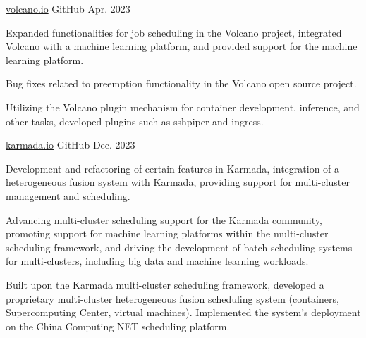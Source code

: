

\begin{cventries}

    \cventry
    {} %
    {\href{https://github.com/volcano-sh/volcano}{volcano.io}} %
    {GitHub} %
    {Apr. 2023} %
    {
      \begin{cvitems} %
        \item Expanded functionalities for job scheduling in the Volcano project, integrated Volcano with a machine learning platform, and provided support for the machine learning platform.
        \item Bug fixes related to preemption functionality in the Volcano open source project.
        \item Utilizing the Volcano plugin mechanism for container development, inference, and other tasks, developed plugins such as sshpiper and ingress.
      \end{cvitems}
    }

    \cventry
    {} %
    {\href{https://github.com/karmada-io/karmada}{karmada.io}} %
    {GitHub} %
    {Dec. 2023} %
    {
      \begin{cvitems} %
        \item Development and refactoring of certain features in Karmada, integration of a heterogeneous fusion system with Karmada, providing support for multi-cluster management and scheduling.
        \item Advancing multi-cluster scheduling support for the Karmada community, promoting support for machine learning platforms within the multi-cluster scheduling framework, and driving the development of batch scheduling systems for multi-clusters, including big data and machine learning workloads.
        \item Built upon the Karmada multi-cluster scheduling framework, developed a proprietary multi-cluster heterogeneous fusion scheduling system (containers, Supercomputing Center, virtual machines). Implemented the system's deployment on the China Computing NET scheduling platform.
      \end{cvitems}
    }


\end{cventries}

